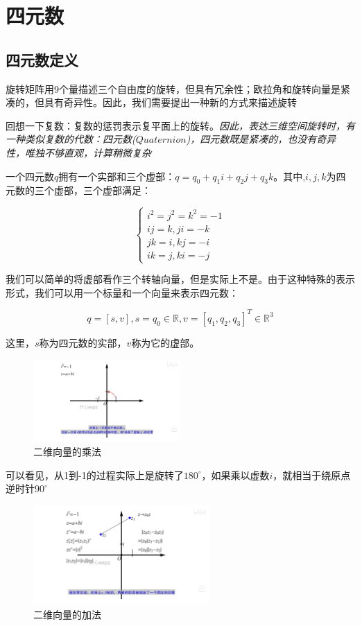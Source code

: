 \section{四元数}

\subsection{四元数定义}

    旋转矩阵用9个量描述三个自由度的旋转，但具有冗余性；欧拉角和旋转向量是紧凑的，但具有奇异性。因此，我们需要提出一种新的方式来描述旋转

    回想一下复数：复数的惩罚表示复平面上的旋转。\emph{因此，表达三维空间旋转时，有一种类似复数的代数：四元数($Quaternion$)，四元数既是紧凑的，也没有奇异性，唯独不够直观，计算稍微复杂}

    一个四元数$q$拥有一个实部和三个虚部：$q = q_0 + q_1i + q_2j + q_3k$。其中,$i, j, k$为四元数的三个虚部，三个虚部满足：

$$
\begin{cases}
    i^2 = j^2 = k^2 = -1 \\
    ij = k, ji = -k \\
    jk = i, kj = -i \\
    ik = j, ki = -j 
\end{cases}
$$

    我们可以简单的将虚部看作三个转轴向量，但是实际上不是。由于这种特殊的表示形式，我们可以用一个标量和一个向量来表示四元数：

$$
    q = [s, v], s = q_0 \in \mathbb{R}, v = [q_1, q_2, q_3]^T \in \mathbb{R}^3
$$

    这里，$s$称为四元数的实部，$v$称为它的虚部。

\begin{figure}[!htbp]
    \centering
    \includegraphics[width=0.5\textwidth]{image/chapter02/二维向量乘法.png}
    \caption{二维向量的乘法}
\end{figure}

    可以看见，从1到-1的过程实际上是旋转了$180^{\circ}$，如果乘以虚数$i$，就相当于绕原点逆时针$90^{\circ}$

\begin{figure}[!htbp]
    \centering
    \includegraphics[width=0.6\textwidth]{image/chapter02/二维向量加减.png}
    \caption{二维向量的加法}
\end{figure}

